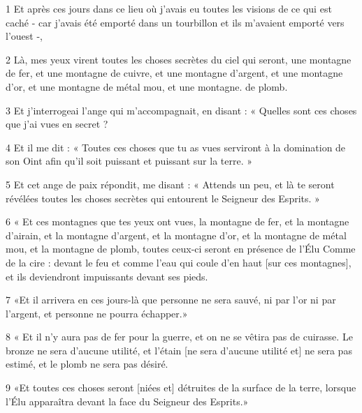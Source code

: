 
\par 1 Et après ces jours dans ce lieu où j'avais eu toutes les visions de ce qui est caché - car j'avais été emporté dans un tourbillon et ils m'avaient emporté vers l'ouest -,
\par 2 Là, mes yeux virent toutes les choses secrètes du ciel qui seront, une montagne de fer, et une montagne de cuivre, et une montagne d'argent, et une montagne d'or, et une montagne de métal mou, et une montagne. de plomb.
\par 3 Et j'interrogeai l'ange qui m'accompagnait, en disant : « Quelles sont ces choses que j'ai vues en secret ?
\par 4 Et il me dit : « Toutes ces choses que tu as vues serviront à la domination de son Oint afin qu'il soit puissant et puissant sur la terre. »
\par 5 Et cet ange de paix répondit, me disant : « Attends un peu, et là te seront révélées toutes les choses secrètes qui entourent le Seigneur des Esprits. »
\par 6 « Et ces montagnes que tes yeux ont vues, la montagne de fer, et la montagne d'airain, et la montagne d'argent, et la montagne d'or, et la montagne de métal mou, et la montagne de plomb, toutes ceux-ci seront en présence de l'Élu Comme de la cire : devant le feu et comme l'eau qui coule d'en haut [sur ces montagnes], et ils deviendront impuissants devant ses pieds.
\par 7 «Et il arrivera en ces jours-là que personne ne sera sauvé, ni par l'or ni par l'argent, et personne ne pourra échapper.»
\par 8 « Et il n'y aura pas de fer pour la guerre, et on ne se vêtira pas de cuirasse. Le bronze ne sera d'aucune utilité, et l'étain [ne sera d'aucune utilité et] ne sera pas estimé, et le plomb ne sera pas désiré.
\par 9 «Et toutes ces choses seront [niées et] détruites de la surface de la terre, lorsque l'Élu apparaîtra devant la face du Seigneur des Esprits.»


